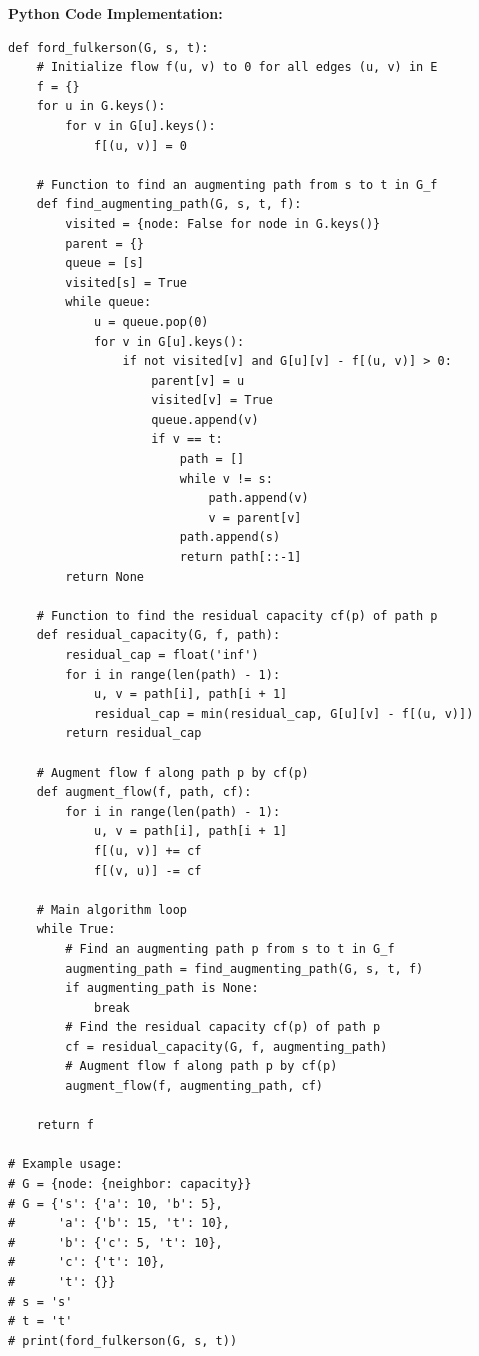 \documentclass[12pt]{book} %
\begin{document}
\textbf{Python Code Implementation:}
\FloatBarrier
\begin{lstlisting}
def ford_fulkerson(G, s, t):
    # Initialize flow f(u, v) to 0 for all edges (u, v) in E
    f = {}
    for u in G.keys():
        for v in G[u].keys():
            f[(u, v)] = 0
    
    # Function to find an augmenting path from s to t in G_f
    def find_augmenting_path(G, s, t, f):
        visited = {node: False for node in G.keys()}
        parent = {}
        queue = [s]
        visited[s] = True
        while queue:
            u = queue.pop(0)
            for v in G[u].keys():
                if not visited[v] and G[u][v] - f[(u, v)] > 0:
                    parent[v] = u
                    visited[v] = True
                    queue.append(v)
                    if v == t:
                        path = []
                        while v != s:
                            path.append(v)
                            v = parent[v]
                        path.append(s)
                        return path[::-1]
        return None
    
    # Function to find the residual capacity cf(p) of path p
    def residual_capacity(G, f, path):
        residual_cap = float('inf')
        for i in range(len(path) - 1):
            u, v = path[i], path[i + 1]
            residual_cap = min(residual_cap, G[u][v] - f[(u, v)])
        return residual_cap
    
    # Augment flow f along path p by cf(p)
    def augment_flow(f, path, cf):
        for i in range(len(path) - 1):
            u, v = path[i], path[i + 1]
            f[(u, v)] += cf
            f[(v, u)] -= cf
    
    # Main algorithm loop
    while True:
        # Find an augmenting path p from s to t in G_f
        augmenting_path = find_augmenting_path(G, s, t, f)
        if augmenting_path is None:
            break
        # Find the residual capacity cf(p) of path p
        cf = residual_capacity(G, f, augmenting_path)
        # Augment flow f along path p by cf(p)
        augment_flow(f, augmenting_path, cf)
    
    return f

# Example usage:
# G = {node: {neighbor: capacity}}
# G = {'s': {'a': 10, 'b': 5},
#      'a': {'b': 15, 't': 10},
#      'b': {'c': 5, 't': 10},
#      'c': {'t': 10},
#      't': {}}
# s = 's'
# t = 't'
# print(ford_fulkerson(G, s, t))
\end{lstlisting}
\end{document}
